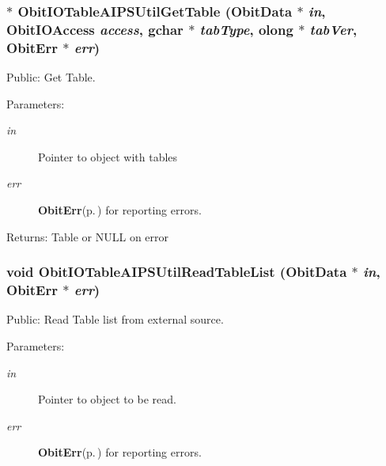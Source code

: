 \subsubsection{$\ast$ Obit\-IOTable\-AIPSUtil\-Get\-Table ({\bf Obit\-Data} $\ast$ {\em in}, Obit\-IOAccess {\em access}, gchar $\ast$ {\em tab\-Type}, {\bf olong} $\ast$ {\em tab\-Ver}, {\bf Obit\-Err} $\ast$ {\em err})}\label{ObitIOTableAIPSUtil_8h_a2}


Public: Get Table. 

\begin{Desc}
\item[Parameters:]
\begin{description}
\item[{\em in}]Pointer to object with tables \item[{\em err}]{\bf Obit\-Err}{\rm (p.\,\pageref{structObitErr})} for reporting errors. \end{description}
\end{Desc}
\begin{Desc}
\item[Returns:]Table or NULL on error \end{Desc}
\subsubsection{\setlength{\rightskip}{0pt plus 5cm}void Obit\-IOTable\-AIPSUtil\-Read\-Table\-List ({\bf Obit\-Data} $\ast$ {\em in}, {\bf Obit\-Err} $\ast$ {\em err})}\label{ObitIOTableAIPSUtil_8h_a0}


Public: Read Table list from external source. 

\begin{Desc}
\item[Parameters:]
\begin{description}
\item[{\em in}]Pointer to object to be read. \item[{\em err}]{\bf Obit\-Err}{\rm (p.\,\pageref{structObitErr})} for reporting errors. \end{description}
\end{Desc}
